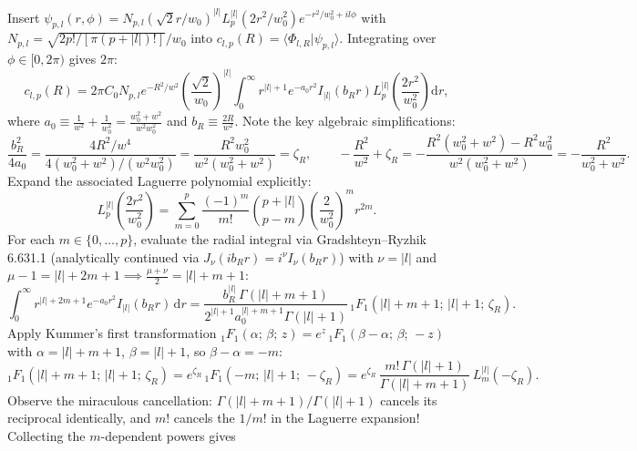 \documentclass[10pt,letterpaper]{article}
\newcommand{\braket}[2]{\langle #1 | #2 \rangle}
\newcommand{\abs}[1]{\lvert #1 \rvert}
\newcommand{\dd}{\mathrm{d}}
\numberwithin{equation}{section}
\begin{document}
Insert $\psi_{p,l}(r,\phi) = N_{p,l}(\sqrt{2}r/w_0)^{\abs{l}} L_p^{\abs{l}}(2r^2/w_0^2) e^{-r^2/w_0^2 + il\phi}$ with $N_{p,l} = \sqrt{2p!/[\pi(p+\abs{l})!]}/w_0$ into $c_{l,p}(R) = \braket{\Phi_{l,R}}{\psi_{p,l}}$. Integrating over $\phi \in [0,2\pi)$ gives $2\pi$:
\begin{equation}
  c_{l,p}(R) = 2\pi C_0 N_{p,l} e^{-R^2/w^2}\left(\frac{\sqrt{2}}{w_0}\right)^{\abs{l}} \int_0^\infty r^{\abs{l}+1} e^{-a_0 r^2} I_{\abs{l}}(b_R r) L_p^{\abs{l}}\!\left(\frac{2r^2}{w_0^2}\right)\dd r,
\end{equation}
where $a_0 \equiv \frac{1}{w^2} + \frac{1}{w_0^2} = \frac{w_0^2+w^2}{w^2 w_0^2}$ and $b_R \equiv \frac{2R}{w^2}$. Note the key algebraic simplifications:
\begin{equation}
  \frac{b_R^2}{4a_0} = \frac{4R^2/w^4}{4(w_0^2+w^2)/(w^2 w_0^2)} = \frac{R^2 w_0^2}{w^2(w_0^2+w^2)} = \zeta_R, \qquad
  -\frac{R^2}{w^2} + \zeta_R = -\frac{R^2(w_0^2+w^2) - R^2 w_0^2}{w^2(w_0^2+w^2)} = -\frac{R^2}{w_0^2+w^2}.
\end{equation}
Expand the associated Laguerre polynomial explicitly:
\begin{equation}
  L_p^{\abs{l}}\!\left(\frac{2r^2}{w_0^2}\right) = \sum_{m=0}^p \frac{(-1)^m}{m!}\binom{p+\abs{l}}{p-m}\left(\frac{2}{w_0^2}\right)^m r^{2m}.
\end{equation}
For each $m \in \{0,\dots,p\}$, evaluate the radial integral via Gradshteyn--Ryzhik 6.631.1 (analytically continued via $J_\nu(i b_R r) = i^\nu I_\nu(b_R r)$) with $\nu = \abs{l}$ and $\mu - 1 = \abs{l} + 2m + 1 \implies \frac{\mu+\nu}{2} = \abs{l} + m + 1$:
\begin{equation}
  \int_0^\infty r^{\abs{l}+2m+1} e^{-a_0 r^2} I_{\abs{l}}(b_R r)\,\dd r = \frac{b_R^{\abs{l}}\,\Gamma(\abs{l}+m+1)}{2^{\abs{l}+1} a_0^{\abs{l}+m+1}\Gamma(\abs{l}+1)}\,{}_1F_1\!\left(\abs{l}+m+1;\,\abs{l}+1;\,\zeta_R\right).
\end{equation}
Apply Kummer's first transformation ${}_1F_1(\alpha;\,\beta;\,z) = e^z\,{}_1F_1(\beta-\alpha;\,\beta;\,-z)$ with $\alpha = \abs{l}+m+1$, $\beta = \abs{l}+1$, so $\beta - \alpha = -m$:
\begin{equation}
  {}_1F_1(\abs{l}+m+1;\,\abs{l}+1;\,\zeta_R) = e^{\zeta_R}\,{}_1F_1(-m;\,\abs{l}+1;\,-\zeta_R) = e^{\zeta_R}\,\frac{m!\,\Gamma(\abs{l}+1)}{\Gamma(\abs{l}+m+1)}\,L_m^{\abs{l}}(-\zeta_R).
\end{equation}
Observe the miraculous cancellation: $\Gamma(\abs{l}+m+1)/\Gamma(\abs{l}+1)$ cancels its reciprocal identically, and $m!$ cancels the $1/m!$ in the Laguerre expansion! Collecting the $m$-dependent powers gives
\end{document}
